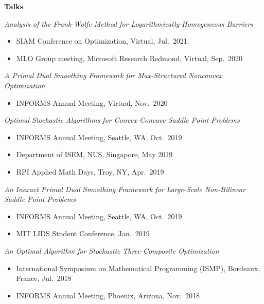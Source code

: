 \documentclass[11pt]{article}
\begin{document}
\begin{minipage}[t]{0.18\textwidth}
\textbf{Talks}
\end{minipage}
\begin{minipage}[t]{0.8\textwidth}

{\em Analysis of the Frank-Wolfe Method for Logarithmically-Homogeneous Barriers}
\begin{itemize}
\item SIAM Conference on Optimization, Virtual, Jul.\ 2021.
\item MLO Group meeting, Microsoft Research Redmond, Virtual, Sep.\ 2020
\end{itemize}

{\em A Primal Dual Smoothing Framework for Max-Structured Nonconvex Optimization}
\begin{itemize}
\item INFORMS Annual Meeting, Virtual, Nov.\ 2020 
\end{itemize}

{\em Optimal Stochastic Algorithms for Convex-Concave Saddle Point Problems} 
\begin{itemize}
\item INFORMS Annual Meeting, Seattle, WA, Oct.\ 2019
\item Department of ISEM, NUS, Singapore, May 2019
\item RPI Applied Math Days, Troy, NY, Apr.\ 2019
\end{itemize}
    



{\em An Inexact Primal Dual Smoothing Framework for Large-Scale Non-Bilinear Saddle Point Problems}
\begin{itemize}
\item INFORMS Annual Meeting, Seattle, WA, Oct.\ 2019 
\item MIT LIDS Student Conference, Jan.\ 2019
\end{itemize}

{\em An Optimal Algorithm for Stochastic Three-Composite Optimization}
\begin{itemize}
\item International Symposium on Mathematical Programming (ISMP), Bordeaux, France, Jul.\ 2018
\item INFORMS Annual Meeting, Phoenix, Arizona, Nov.\ 2018
\end{itemize}
\end{minipage}
\vspace{.5cm}
\end{document}

